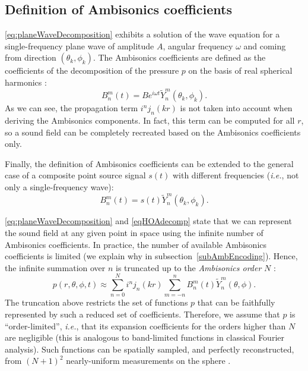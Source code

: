 \subsection{Definition of Ambisonics coefficients}

\eqref{eq:planeWaveDecomposition} exhibits a solution of the wave equation for a single-frequency plane wave of amplitude $A$, angular frequency $\omega$ and coming from direction $(\theta_k,\phi_k)$. The Ambisonics coefficients are defined as the coefficients of the decomposition of the pressure $p$ on the basis of real spherical harmonics \cite{daniel_representation_2001}:
\begin{equation}\label{eqPlaneWaveCf}
    B_n^m(t) = B e^{i \omega t} \tilde{Y}_n^m (\theta_k,\phi_k).
\end{equation}
As we can see, the propagation term $i^n j_n(kr)$ is not taken into account when deriving the Ambisonics components. In fact, this term can be computed for all $r$, so a sound field can be completely recreated based on the Ambisonics coefficients only.

Finally, the definition of Ambisonics coefficients can be extended to the general case of a composite point source signal $s(t)$ with different frequencies (\emph{i.e.}, not only a single-frequency wave):
\begin{equation}\label{eqPlaneWaveCoeff}
     B_n^m(t) = s(t) \tilde{Y}_n^m(\theta_k,\phi_k).
 \end{equation}
 
\eqref{eq:planeWaveDecomposition} and \eqref{eqHOAdecomp} state that we can represent the sound field at any given point in space using the infinite number of Ambisonics coefficients. In practice, the number of available Ambisonics coefficients is limited (we explain why in subsection~\ref{subAmbEncoding}). Hence, the infinite summation over $n$ is truncated up to the \textit{Ambisonics order} $N$ :
\begin{equation}\label{eqAmbiDecomp}
    p(r,\theta,\phi,t) \approx \sum_{n=0}^{N}  i^n  j_n(kr) \sum_{m=-n}^n  B_n^m(t) \tilde{Y}_n^m(\theta,\phi).
\end{equation}
The truncation above restricts the set of functions $p$ that can be faithfully represented by such a reduced set of coefficients. Therefore, we assume that $p$ is ``order-limited'', \emph{i.e.}, that its expansion coefficients for the orders higher than $N$ are negligible \cite{rafaely_fundamentals_2019} (this is analogous to band-limited functions in classical Fourier analysis). Such functions can be spatially sampled, and perfectly reconstructed, from $(N+1)^2$ nearly-uniform measurements on the sphere \cite{jarrett_theory_2017}.


